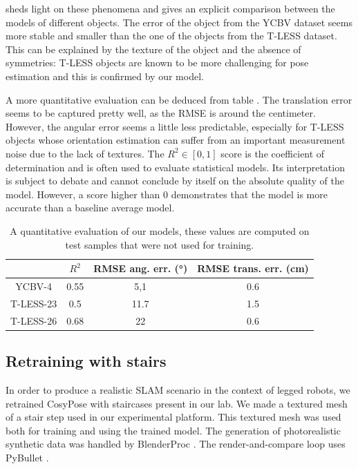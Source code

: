  sheds light on these phenomena and gives an explicit comparison between the models of different objects. 
The error of the object from the YCBV dataset seems more stable and smaller than the one of the objects from the T-LESS dataset. 
This can be explained by the texture of the object and the absence of symmetries: T-LESS objects are known to be more challenging 
for pose estimation and this is confirmed by our model.

A more quantitative evaluation can be deduced from table . The translation error seems to be captured pretty well,
 as the RMSE is around the centimeter. However, the angular error seems a little less predictable, especially for T-LESS objects whose orientation 
 estimation can suffer from an important measurement noise due to the lack of textures. The $R^2\in[0,1]$ score is the coefficient of determination 
 and is often used to evaluate statistical models. Its interpretation is subject to debate and cannot conclude by itself on the absolute quality of the model. 
 However, a score higher than 0 demonstrates that the model is more accurate than a baseline average model.

\begin{table}[h]
    \centering
    \caption{A quantitative evaluation of our models, these values are computed on test samples that were not used for training. }
    \begin{tabular}{|c|c|c|c|}
        \hline 
          & $\displaystyle R^{2}$ & RMSE ang. err. (°) & RMSE trans. err. (cm) \\
        \hline 
         YCBV-4 & 0.55 & 5,1 & 0.6 \\
        \hline 
         T-LESS-23 & 0.5 & 11.7 & 1.5 \\
        \hline 
         T-LESS-26 & 0.68 & 22 & 0.6 \\
         \hline
    \end{tabular}
    \label{tab:empirical_models}
\end{table}



\subsection{Retraining with stairs}
\label{sec:retraining_with_stairs}
In order to produce a realistic SLAM scenario in the context of legged robots, we retrained CosyPose with staircases present in our lab.
We made a textured mesh of a stair step used in our experimental platform. This textured mesh was used both for training and using the trained model. 
The generation of photorealistic synthetic data was handled by BlenderProc \cite{denninger2019blenderproc}. The render-and-compare loop uses PyBullet \cite{coumans2021}.

